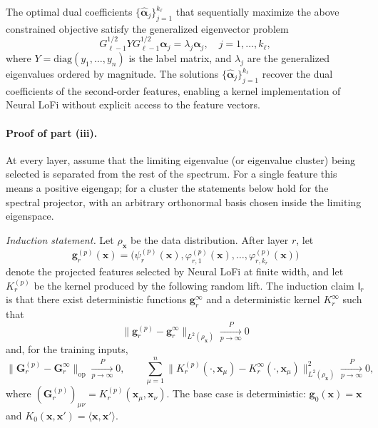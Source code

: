 \begin{proposition}\label{2605:prop:generalized-eigenvector}
The optimal dual coefficients $\{\hat{\bm\alpha}_j\}_{j=1}^{k_\ell}$ that sequentially maximize the above constrained objective satisfy the generalized eigenvector problem
\begin{equation}
G_{\ell-1}^{1/2} Y G_{\ell-1}^{1/2} \bm\alpha_j = \lambda_j \bm\alpha_j, \quad j=1,\dots,k_\ell,
\label{2605:eq:gen-eigenproblem}
\end{equation}
where $Y = \mathrm{diag}(y_1, \dots, y_n)$ is the label matrix, and $\lambda_j$ are the generalized eigenvalues ordered by magnitude. The solutions $\{\hat{\bm\alpha}_j\}_{j=1}^{k_\ell}$ recover the dual coefficients of the second-order features, enabling a kernel implementation of Neural LoFi without explicit access to the feature vectors.
\end{proposition}

\paragraph{Proof of part (iii).}
At every layer, assume that the limiting eigenvalue (or
eigenvalue cluster) being selected is separated from the rest of the spectrum. For a single
feature this means a positive eigengap; for a cluster the statements below hold for the
spectral projector, with an arbitrary orthonormal basis chosen inside the limiting
eigenspace.

\emph{Induction statement.} Let $\rho_{\bm x}$ be the data distribution. After layer $r$, let
\[
    \bm g_r^{(p)}(\bm x)
    =
    \bigl(\psi_r^{(p)}(\bm x),\varphi_{r,1}^{(p)}(\bm x),\dots,
    \varphi_{r,k_r}^{(p)}(\bm x)\bigr)
\]
denote the projected features selected by Neural LoFi at finite width, and let
$K_r^{(p)}$ be the kernel produced by the following random lift. The induction claim
$\mathsf I_r$ is that there exist deterministic functions $\bm g_r^\infty$ and a
deterministic kernel $K_r^\infty$ such that
\begin{equation}
    \|\bm g_r^{(p)}-\bm g_r^\infty\|_{L^2(\rho_{\bm x})}\xrightarrow[p\to\infty]{P}0
    \label{2605:eq:feature-induction}
\end{equation}
and, for the training inputs,
\begin{equation}
    \|\bm G_r^{(p)}-\bm G_r^\infty\|_{\mathrm{op}}\xrightarrow[p\to\infty]{P}0,\qquad
    \sum_{\mu=1}^n
    \|K_r^{(p)}(\cdot,\bm x_\mu)-K_r^\infty(\cdot,\bm x_\mu)\|_{L^2(\rho_{\bm x})}^2
    \xrightarrow[p\to\infty]{P}0,
    \label{2605:eq:kernel-section-induction}
\end{equation}
where $(\bm G_r^{(p)})_{\mu\nu}=K_r^{(p)}(\bm x_\mu,\bm x_\nu)$.
The base case is deterministic: $\bm g_0(\bm x)=\bm x$ and $K_0(\bm x,\bm x')=
\langle\bm x,\bm x'\rangle$.

